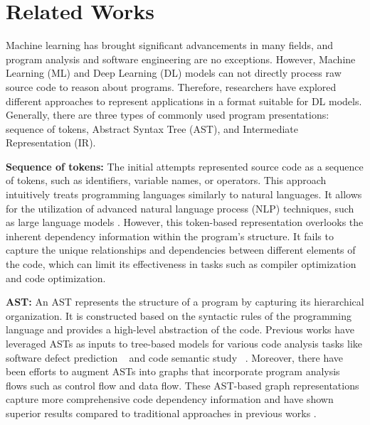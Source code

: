 \section{Related Works}
\label{sec:related_works}
\vspace{-9pt}
Machine learning has brought significant advancements in many fields, and program analysis and software engineering are no exceptions. 
However, Machine Learning (ML) and Deep Learning (DL) models can not directly process raw source code to reason about programs. Therefore, researchers have explored different approaches to represent applications in a format suitable for DL models.
Generally, there are three types of commonly used program presentations: sequence of tokens, Abstract Syntax Tree (AST), and Intermediate Representation (IR).

\textbf{Sequence of tokens:} The initial attempts \cite{dam2016deep, gu2016deep, levy2017learning} represented source code as a sequence of tokens, such as identifiers, variable names, or operators. This approach intuitively treats programming languages similarly to natural languages.
It allows for the utilization of advanced natural language process (NLP) techniques, such as large language models \cite{feng2020codebert, guo2020graphcodebert, guo2022unixcoder}. 
However, this token-based representation overlooks the inherent dependency information within the program's structure. It fails to capture the unique relationships and dependencies between different elements of the code, which can limit its effectiveness in tasks such as compiler optimization and code optimization.

\textbf{AST:} An AST represents the structure of a program by capturing its hierarchical organization. It is constructed based on the syntactic rules of the programming language and provides a high-level abstraction of the code.
Previous works have leveraged ASTs as inputs to tree-based models for various code analysis tasks like software defect prediction ~\cite{dam2019lessons} and code semantic study ~\cite{chen2019capturing}. Moreover, there have been efforts to augment ASTs into graphs that incorporate program analysis flows such as control flow and data flow. These AST-based graph representations capture more comprehensive code dependency information and have shown superior results compared to traditional approaches in previous works \cite{allamanis2022graph, allamanis2017learning}. 

